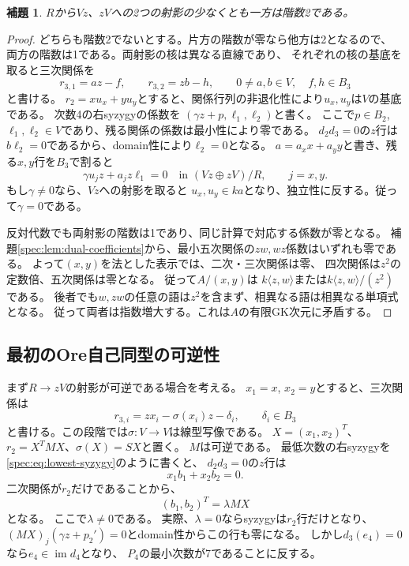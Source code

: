 \documentclass[11pt,a4paper]{ltjsarticle}
\newtheorem{lemma}[theorem]{補題}
\theoremstyle{definition}
\begin{document}
\begin{lemma}\label{spec:lem:cubic-projection}
$R$から$Vz$、$zV$への2つの射影の少なくとも一方は階数2である。
\end{lemma}
\begin{proof}
どちらも階数2でないとする。片方の階数が零なら他方は2となるので、
両方の階数は1である。両射影の核は異なる直線であり、
それぞれの核の基底を取ると三次関係を
\[
r_{3,1}=az-f,\qquad r_{3,2}=zb-h,\qquad
0\ne a,b\in V,\quad f,h\in B_3
\]
と書ける。
$r_2=xu_x+yu_y$とすると、関係行列の非退化性により$u_x,u_y$は$V$の基底である。
次数4の右syzygyの係数を
$(\gamma z+p,\ell_1,\ell_2)$と書く。
ここで$p\in B_2$, $\ell_1,\ell_2\in V$であり、残る関係の係数は最小性により零である。
$d_2d_3=0$の$z$行は$b\ell_2=0$であるから、domain性により$\ell_2=0$となる。
$a=a_xx+a_yy$と書き、残る$x,y$行を$B_3$で割ると
\[
\gamma u_jz+a_jz\ell_1=0
\quad\text{in }(Vz\oplus zV)/R,\qquad j=x,y.
\]
もし$\gamma\ne0$なら、$Vz$への射影を取ると
$u_x,u_y\in ka$となり、独立性に反する。従って$\gamma=0$である。

反対代数でも両射影の階数は1であり、同じ計算で対応する係数が零となる。
補題\ref{spec:lem:dual-coefficients}から、最小五次関係の$zw,wz$係数はいずれも零である。
よって$(x,y)$を法とした表示では、二次・三次関係は零、
四次関係は$z^2$の定数倍、五次関係は零となる。
従って$A/(x,y)$は
$k\langle z,w\rangle$または$k\langle z,w\rangle/(z^2)$である。
後者でも$w,zw$の任意の語は$z^2$を含まず、相異なる語は相異なる単項式となる。
従って両者は指数増大する。これは$A$の有限GK次元に矛盾する。
\end{proof}

\subsection{最初のOre自己同型の可逆性}
まず$R\to zV$の射影が可逆である場合を考える。
$x_1=x$, $x_2=y$とすると、三次関係は
\begin{equation}\label{spec:eq:cubic-graph}
r_{3,i}=zx_i-\sigma(x_i)z-\delta_i,\qquad \delta_i\in B_3
\end{equation}
と書ける。この段階では$\sigma:V\to V$は線型写像である。
$X=(x_1,x_2)^T$、
$r_2=X^TMX$、$\sigma(X)=SX$と置く。
$M$は可逆である。
最低次数の右syzygyを\eqref{spec:eq:lowest-syzygy}のように書くと、
$d_2d_3=0$の$z$行は
\[
x_1b_1+x_2b_2=0.
\]
二次関係が$r_2$だけであることから、
\begin{equation}\label{spec:eq:b-vector}
(b_1,b_2)^T=\lambda MX
\end{equation}
となる。
ここで$\lambda\ne0$である。
実際、$\lambda=0$ならsyzygyは$r_2$行だけとなり、
$(MX)_j(\gamma z+p_2')=0$とdomain性からこの行も零になる。
しかし$d_3(e_4)=0$なら$e_4\in\operatorname{im}d_4$となり、
$P_4$の最小次数が7であることに反する。
\end{document}
